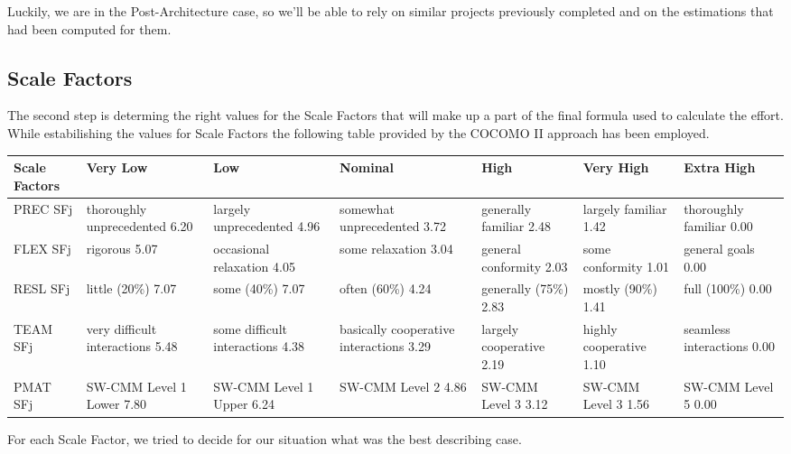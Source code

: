 Luckily, we are in the Post-Architecture case, so we'll be able to rely on similar projects previously completed and on the estimations that had been computed for them.

\subsection{Scale Factors}

The second step is determing the right values for the Scale Factors that will make up a part of the final formula used to calculate the effort. While estabilishing the values for Scale Factors the following table provided by the COCOMO II approach has been employed.

\vspace{16pt}

\begin{tabular}{|p{}|p{}|p{}|p{}|p{}|p{}|p{}|}
\hline
	\textbf{Scale Factors} & \textbf{Very Low} & \textbf{Low} & \textbf{Nominal} & \textbf{High} & \textbf{Very High} & \textbf{Extra High} \\ \hline
	PREC  SFj  & thoroughly unprecedented 6.20 & largely unprecedented 4.96 & somewhat unprecedented 3.72 & generally familiar 2.48 & largely familiar 1.42 & thoroughly familiar 0.00 \\ \hline
	FLEX SFj  & rigorous 5.07 & occasional relaxation 4.05 & some relaxation 3.04 & general conformity 2.03 & some conformity 1.01 & general goals 0.00 \\ \hline
	RESL SFj  & little (20\%) 7.07 & some (40\%) 7.07 & often (60\%) 4.24 & generally (75\%) 2.83 & mostly
(90\%) 1.41 & full (100\%) 0.00 \\ \hline
	TEAM SFj  & very difficult interactions 5.48 & some difficult interactions 4.38 & basically cooperative interactions 3.29 & largely cooperative 2.19 & highly cooperative 1.10 & seamless interactions 0.00  \\ \hline
	PMAT SFj  & SW-CMM Level 1 Lower 7.80 & SW-CMM Level 1 Upper 6.24 & SW-CMM Level 2 4.86 & SW-CMM Level 3 3.12 & SW-CMM Level 3  1.56 & SW-CMM Level 5  0.00 \\ \hline
\end{tabular}

\clearpage

For each Scale Factor, we tried to decide for our situation what was the best describing case.


